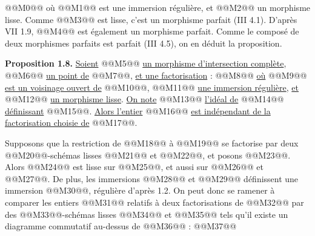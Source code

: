 
@@M0@@
où @@M1@@ est une
immersion régulière, et @@M2@@ un morphisme lisse. Comme @@M3@@ est lisse, c'est un morphisme parfait (III 4.1). D'après VII 1.9, @@M4@@ est également un morphisme parfait. Comme le composé de deux morphismes parfaits est parfait (III 4.5), on en déduit la proposition.

\textbf{Proposition 1.8.} \uline{Soient} @@M5@@ \uline{un morphisme d'intersection complète}, @@M6@@ \uline{un point de} @@M7@@, \uline{et une factorisation} :
@@M8@@
\uline{où} @@M9@@ \uline{est un voisinage ouvert de} @@M10@@, @@M11@@ \uline{une immersion régulière}, \uline{et} @@M12@@ \uline{un morphisme lisse}. \uline{On note} @@M13@@ \uline{l'idéal de} @@M14@@ \uline{définissant} @@M15@@. \uline{Alors l'entier}
@@M16@@
\uline{est indépendant de la factorisation choisie de} @@M17@@.

Supposons que la restriction de @@M18@@ à @@M19@@ se factorise par deux @@M20@@-schémas lisses @@M21@@ et @@M22@@, et posons @@M23@@. Alors @@M24@@ est lisse sur @@M25@@, et aussi sur @@M26@@ et @@M27@@. De plus, les immersions @@M28@@ et @@M29@@ définissent une immersion @@M30@@, régulière d'après 1.2. On peut donc se ramener à comparer les entiers @@M31@@ relatifs à deux factorisations de @@M32@@ par des @@M33@@-schémas lisses @@M34@@ et @@M35@@ tels qu'il existe un diagramme commutatif au-dessus de @@M36@@ :
@@M37@@
